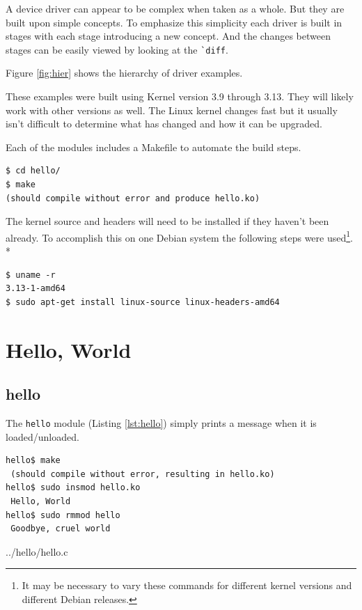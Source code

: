 \documentclass{article}
\begin{document}
A device driver can appear to be complex when taken as a whole.
But they are built upon simple concepts.
To emphasize this simplicity each driver is built in stages with
each stage introducing a new concept.
And the changes between stages can be easily viewed by looking
at the \verb+`diff+.

Figure \ref{fig:hier} shows the hierarchy of driver examples.

These examples were built using Kernel version 3.9 through 3.13.
They will likely work with other versions as well.
The Linux kernel changes fast but it usually isn't difficult to
determine what has changed and how it can be upgraded.

Each of the modules includes a Makefile to automate the build steps.

\begin{verbatim}
$ cd hello/
$ make
(should compile without error and produce hello.ko)
\end{verbatim}

The kernel source and headers will need to be installed if they
haven't been already.
To accomplish this on one Debian\autocite{debian} system the following steps
were used\footnote{It may be necessary to vary these commands
for different kernel versions and different Debian releases.}.
\\*
\begin{Verbatim}[samepage=true]
$ uname -r
3.13-1-amd64
$ sudo apt-get install linux-source linux-headers-amd64
\end{Verbatim}


\section{Hello, World}

\subsection{hello}

The \verb+hello+ module (Listing \ref{lst:hello}) simply prints a message
when it is loaded/unloaded.

\begin{verbatim}
hello$ make
 (should compile without error, resulting in hello.ko)
hello$ sudo insmod hello.ko
 Hello, World
hello$ sudo rmmod hello
 Goodbye, cruel world
\end{verbatim}


	{../hello/hello.c}
\end{document}
